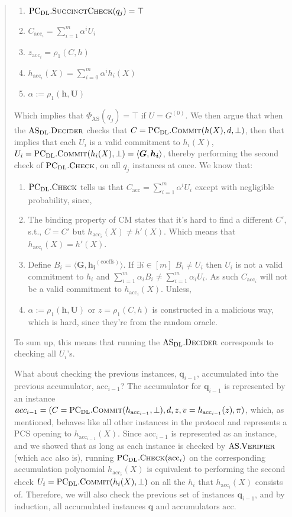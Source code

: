 \documentclass[
]{article}
\renewcommand*\a{\alpha}
\renewcommand{\vec}[1]{ \boldsymbol{#1} }
\newcommand{\ip}[2]{ \langle #1, #2 \rangle }
\newcommand*{\acc}{\mathrm{acc}}
\newcommand*{\Verifier}{\mathrm{\text{V\scriptsize ERIFIER}}}
\newcommand*{\Commit}{\mathrm{\text{C{\scriptsize OMMIT}}}}
\newcommand*{\AS}{\text{AS}}
\newcommand*{\ASVerifier}{\AS.\Verifier}
\newcommand*{\PCDL}{\text{PC}_{\text{DL}}}
\newcommand*{\PCDLCommit}{\PCDL.\Commit}
\newcommand*{\PCDLSuccinctCheck}{\PCDL.\mathrm{\text{S{\scriptsize UCCINCT}C{\scriptsize HECK}}}}
\newcommand*{\PCDLCheck}{\PCDL.\mathrm{\text{C\scriptsize HECK}}}
\newcommand*{\ASDL}{\text{AS}_{\text{DL}}}
\newcommand*{\ASDLDecider}{\ASDL.\mathrm{\text{D\scriptsize ECIDER}}}
\newcommand*{\CM}{\mathrm{\text{CM}}}
\begin{document}
\begin{quote}
\begin{enumerate}
  \item $\PCDLSuccinctCheck(q_j) = \top$
  \item $C_{\acc_i} = \sum_{i=1}^m \a^i U_i$
  \item $z_{\acc_i} = \rho_1(C, h)$
  \item $h_{\acc_i}(X) = \sum_{i=0}^m \a^i h_i(X)$
  \item $\a := \rho_1(\vec{h}, \vec{U})$
\end{enumerate}

Which implies that $\Phi_\AS(q_j) = \top$ if $U = G^{(0)}$. We then argue that
when the $\ASDLDecider$ checks that $C = \PCDLCommit(h(X), d, \bot)$, then
that implies that each $U_i$ is a valid commitment to $h_i(X)$, $U_i =
\PCDLCommit(h_i(X), \bot) = \ip{\vec{G}}{\vec{h_i}}$, thereby performing
the second check of $\PCDLCheck$, on all $q_j$ instances at once. We know that:

\begin{enumerate}
  \item
    $\PCDLCheck$ tells us that $C_\acc = \sum_{i=1}^m \a^i U_i$ except with
    negligible probability, since,
  \item
    The binding property of $\CM$ states that it's hard to find a different
    $C'$, s.t., $C = C'$ but $h_{\acc_i}(X) \neq h'(X)$. Which means that
    $h_{\acc_i}(X) = h'(X)$.
  \item
    Define $B_i = \ip{\vec{G}}{\vec{h_i}^{(\text{coeffs})}}$. If $\exists i
    \in [m]$ $B_i \neq U_i$ then $U_i$ is not a valid commitment to $h_i$ and
    $\sum_{i=1}^m \a_i B_i \neq \sum_{i=1}^m \a_i U_i$. As such $C_{\acc_i}$
    will not be a valid commitment to $h_{\acc_i}(X)$. Unless,
  \item
    $\a := \rho_1(\vec{h}, \vec{U})$ or $z = \rho_1(C, h)$ is constructed
    in a malicious way, which is hard, since they're from the random oracle.
\end{enumerate}

To sum up, this means that running the $\ASDLDecider$ corresponds to checking
all $U_i$'s.

What about checking the previous instances, $\vec{q}_{i-1}$, accumulated into
the previous accumulator, $\acc_{i-1}$? The accumulator for $\vec{q}_{i-1}$
is represented by an instance $acc_{i-1} = (C = \PCDLCommit(h_{\acc_{i-1}},
\bot), d, z, v = h_{\acc_{i-1}}(z), \pi)$, which, as mentioned, behaves
like all other instances in the protocol and represents a PCS opening
to $h_{\acc_{i-1}}(X)$. Since $\acc_{i-1}$ is represented as an instance,
and we showed that as long as each instance is checked by $\ASVerifier$
(which $\acc$ also is), running $\PCDLCheck(\acc_i)$ on the corresponding
accumulation polynomial $h_{\acc_i}(X)$ is equivalent to performing the second
check $U_i = \PCDLCommit(h_i(X), \bot)$ on all the $h_i$ that $h_{\acc_i}(X)$
consists of. Therefore, we will also check the previous set of instances
$\vec{q}_{i-1}$, and by induction, all accumulated instances $\vec{q}$
and accumulators $\vec{\acc}$.

\end{quote}
\end{document}
